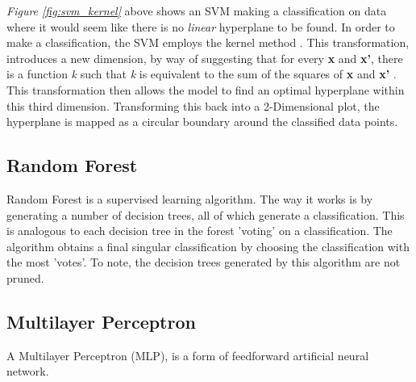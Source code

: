 \documentclass[11pt, a4paper]{article}
\begin{document}
\emph{Figure \ref{fig:svm_kernel}} above shows an SVM making a classification on data where it would seem like there is no \emph{linear} hyperplane to be found. In order to make a classification, the SVM employs the kernel method \cite{ray2017svm}. This transformation, introduces a new dimension, by way of suggesting that for every \textbf{x} and \textbf{x'}, there is a function \emph{k} such that \emph{k} is equivalent to the sum of the squares of \textbf{x} and \textbf{x'} \cite{hofmann2008kernel}. This transformation then allows the model to find an optimal hyperplane within this third dimension. Transforming this back into a 2-Dimensional plot, the hyperplane is mapped as a circular boundary around the classified data points.

\subsection{Random Forest}

Random Forest is a supervised learning algorithm. The way it works is by generating a number of decision trees, all of which generate a classification. This is analogous to each decision tree in the forest 'voting' on a classification. The algorithm obtains a final singular classification by choosing the classification with the most 'votes'. To note, the decision trees generated by this algorithm are not pruned. 

\subsection{Multilayer Perceptron}

A Multilayer Perceptron (MLP), is a form of feedforward artificial neural network. 
  


\newpage


\end{document}
